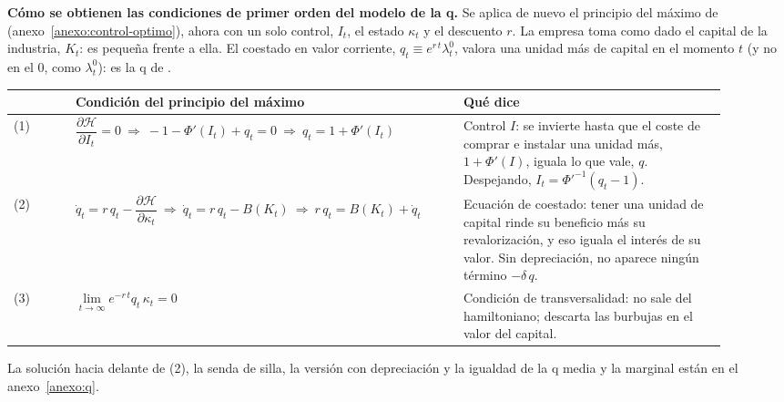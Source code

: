 \documentclass[11pt]{article}
\begin{document}
\begin{anotaciones}[unbreakable]
\textbf{Cómo se obtienen las condiciones de primer orden del modelo de la q.} Se aplica de nuevo el principio del máximo de  (anexo~\ref{anexo:control-optimo}), ahora con un solo control, $I_t$, el estado $\kappa_t$ y el descuento $r$. La empresa toma como dado el capital de la industria, $K_t$: es pequeña frente a ella. El coestado en valor corriente, $q_t\equiv e^{r\,t}\lambda^0_t$, valora una unidad más de capital en el momento $t$ (y no en el 0, como $\lambda^0_t$): es la q de .

\medskip
{\centering\renewcommand{\arraystretch}{1.5}%
\begin{tabular}{@{}>{\centering\arraybackslash}m{0.08\linewidth}>{\raggedright\arraybackslash}m{0.49\linewidth}>{\raggedright\arraybackslash}m{0.34\linewidth}@{}}
\toprule
 & \textbf{Condición del principio del máximo} & \textbf{Qué dice}\\
\midrule
(1) & $\dfrac{\partial\mathcal{H}}{\partial I_t}=0\ \Rightarrow\ -1-\Phi'(I_t)+q_t=0\ \Rightarrow\ \boxed{q_t=1+\Phi'(I_t)}$ & Control $I$: se invierte hasta que el coste de comprar e instalar una unidad más, $1+\Phi'({I})$, iguala lo que vale, $q$. Despejando, $I_t=\Phi'^{-1}(q_t-1)$.\\
(2) & $\dot q_t=r\,q_t-\dfrac{\partial\mathcal{H}}{\partial\kappa_t}\ \Rightarrow\ \dot q_t=r\,q_t-B(K_t)\ \Rightarrow\ \boxed{r\,q_t=B(K_t)+\dot q_t}$ & Ecuación de coestado: tener una unidad de capital rinde su beneficio más su revalorización, y eso iguala el interés de su valor. Sin depreciación, no aparece ningún término $-\delta\,q$.\\
(3) & $\boxed{\lim\limits_{t\to\infty}e^{-r\,t}q_t\,\kappa_t=0}$ & Condición de transversalidad: no sale del hamiltoniano; descarta las burbujas en el valor del capital.\\
\bottomrule
\end{tabular}\par}
\medskip
La solución hacia delante de (2), la senda de silla, la versión con depreciación y la igualdad de la q media y la marginal están en el anexo~\ref{anexo:q}.
\end{anotaciones}
\end{document}
